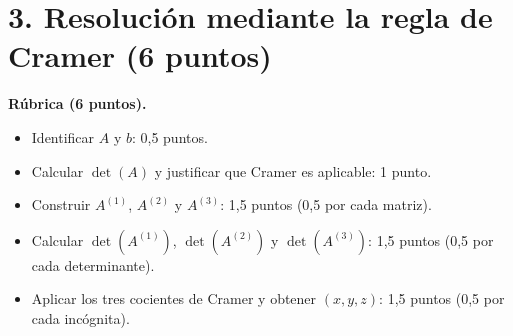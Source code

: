 \documentclass[10pt,a4]{examenEPN0}
\begin{document}
\newpage
\section*{3. Resolución mediante la regla de Cramer (6 puntos)}
\noindent\textbf{Rúbrica (6 puntos).}
\begin{itemize}[itemsep=2pt]
    \item Identificar $A$ y $b$: 0,5 puntos.
    \item Calcular $\det(A)$ y justificar que Cramer es aplicable: 1 punto.
    \item Construir $A^{(1)}$, $A^{(2)}$ y $A^{(3)}$: 1,5 puntos
          (0,5 por cada matriz).
    \item Calcular $\det(A^{(1)})$, $\det(A^{(2)})$ y $\det(A^{(3)})$:
          1,5 puntos (0,5 por cada determinante).
    \item Aplicar los tres cocientes de Cramer y obtener $(x,y,z)$:
          1,5 puntos (0,5 por cada incógnita).
\end{itemize}
\end{document}
